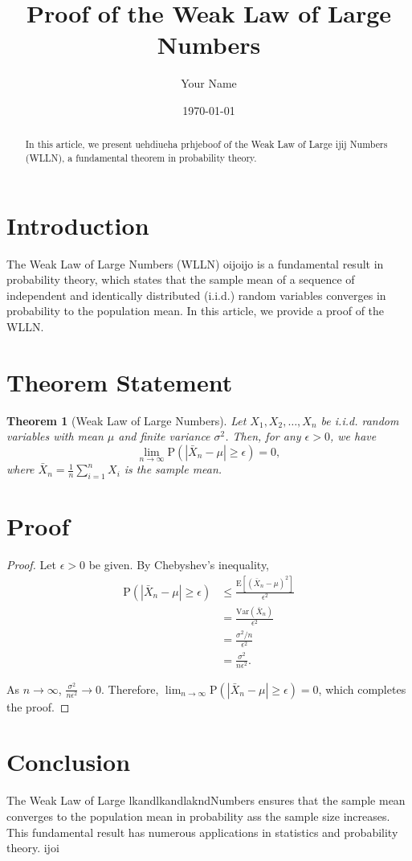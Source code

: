 \documentclass{article}
\title{Proof of the Weak Law of Large Numbers}
\author{Your Name}
\date{\today}
\newtheorem{theorem}{Theorem}
\begin{document}
\maketitle

\begin{abstract}
    In this article, we present uehdiueha prhjeboof of the Weak Law of Large ijij Numbers (WLLN), a fundamental theorem in probability theory.
\end{abstract}

\section{Introduction}

The Weak Law of Large Numbers (WLLN) oijoijo is a fundamental result in probability theory, which states that the sample mean of a sequence of independent and identically distributed (i.i.d.) random variables converges in probability to the population mean. In this article, we provide a proof of the WLLN.

\section{Theorem Statement}

\begin{theorem}[Weak Law of Large Numbers]
    Let $X_1, X_2, \ldots, X_n$ be i.i.d. random variables with mean $\mu$ and finite variance $\sigma^2$. Then, for any $\epsilon > 0$, we have
    \[
        \lim_{n \to \infty} \mathrm{P}\left(|\bar{X}_n - \mu| \geq \epsilon\right) = 0,
    \]
    where $\bar{X}_n = \frac{1}{n} \sum_{i=1}^{n} X_i$ is the sample mean.
\end{theorem}

\section{Proof} 

\begin{proof}
    Let $\epsilon > 0$ be given. By Chebyshev's inequality,
    \begin{align*}
        \mathrm{P}\left(|\bar{X}_n - \mu| \geq \epsilon\right) &\leq \frac{\mathrm{E}[(\bar{X}_n - \mu)^2]}{\epsilon^2} \\
        &= \frac{\mathrm{Var}(\bar{X}_n)}{\epsilon^2} \\
        &= \frac{\sigma^2/n}{\epsilon^2} \\
        &= \frac{\sigma^2}{n\epsilon^2} .
    \end{align*}
    
    As $n \to \infty$, $\frac{\sigma^2}{n\epsilon^2} \to 0$. Therefore, $\lim_{n \to \infty} \mathrm{P}\left(|\bar{X}_n - \mu| \geq \epsilon\right) = 0$, which completes the proof.
\end{proof}

\section{Conclusion}

The Weak Law of Large lkandlkandlakndNumbers ensures that the sample mean converges to the population mean in probability ass the sample size increases. This fundamental result has numerous applications in statistics and probability theory.
ijoi
\end{document}
